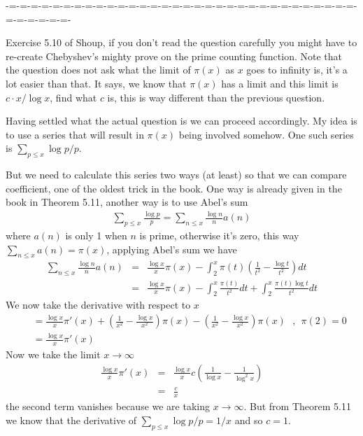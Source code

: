 \documentclass[aps,preprint,preprintnumbers,nofootinbib,showpacs,prd]{revtex4-1}
\newcommand{\nbea}{\begin{eqnarray*}}
\newcommand{\neea}{\end{eqnarray*}}
\begin{document}
-=-=-=-=-=-=-=-=-=-=-=-=-=-=-=-=-=-=-=-=-=-=-=-=-=-=-=-=-=-=-=-=-=-=-=-=-=-=-

Exercise 5.10 of Shoup, if you don't read the question carefully you might have to re-create Chebyshev's mighty prove on the prime counting function. Note that the question does not ask what the limit of $\pi(x)$ as $x$ goes to infinity is, it's a lot easier than that. It says, we know that $\pi(x)$ has a limit and this limit is $c\cdot x/\log x$, find what $c$ is, this is way different than the previous question.

Having settled what the actual question is we can proceed accordingly. My idea is to use a series that will result in $\pi(x)$ being involved somehow. One such series is $\sum_{p\le x} \log p/p$.

But we need to calculate this series two ways (at least) so that we can compare coefficient, one of the oldest trick in the book. One way is already given in the book in Theorem 5.11, another way is to use Abel's sum
%
\nbea
\sum_{p\le x} \frac{\log p}{p} = \sum_{n\le x} \frac{\log n}{n} a(n)
\neea
%
where $a(n)$ is only 1 when $n$ is prime, otherwise it's zero, this way $\sum_{n \le x} a(n) = \pi(x)$, applying Abel's sum we have
%
\nbea
\sum_{n\le x} \frac{\log n}{n} a(n) & = & \frac{\log x}{x} \pi(x) - \int_2^x \pi(t) \left( \frac{1}{t^2} - \frac{\log t}{t^2}\right) dt \\
& = & \frac{\log x}{x} \pi(x) - \int_2^x \frac{\pi(t)}{t^2}dt + \int_2^x \frac{\pi(t) \log t}{t^2} dt
\neea
%
We now take the derivative with respect to $x$
%
\nbea
&& = \frac{\log x}{x} \pi'(x) + \left( \frac{1}{x^2} - \frac{\log x}{x^2}\right)\pi(x) - \left( \frac{1}{x^2} - \frac{\log x}{x^2}\right)\pi(x) ~~~,~~\pi(2) = 0 \\
&& = \frac{\log x}{x} \pi'(x)
\neea
%
Now we take the limit $x\to\infty$
%
\nbea
\frac{\log x}{x} \pi'(x) & = & \frac{\log x}{x} c \left(\frac{1}{\log x} - \frac{1}{\log^2 x}\right) \\
& = & \frac{c}{x}
\neea
%
the second term vanishes because we are taking $x\to\infty$. But from Theorem 5.11 we know that the derivative of $\sum_{p\le x} \log p/p = 1/x$ and so $c=1$.
\end{document}
